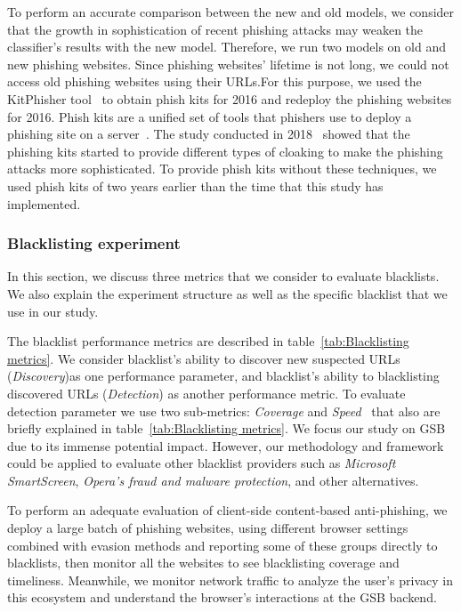 To perform an accurate comparison between the new and old models, we consider that the growth in sophistication of recent phishing attacks may weaken the classifier's results with the new model. Therefore, we run two models on old and new phishing websites.
Since phishing websites' lifetime is not long, we could not access old phishing websites using their URLs.For this purpose, we used the KitPhisher tool~\cite{cybercdh} to obtain phish kits for 2016 and redeploy the phishing websites for 2016.
Phish kits are a unified set of tools that phishers use to deploy a phishing site on a server~\cite{mccalley2011analysis}. The study conducted in 2018~\cite{oest2018inside} showed that the phishing kits started to provide different types of cloaking to make the phishing attacks more sophisticated. To provide phish kits without these techniques, we used phish kits of two years earlier than the time that this study has implemented.

\subsubsection{Blacklisting experiment}
In this section, we discuss three metrics that we consider to evaluate blacklists. We also explain the experiment structure as well as the specific blacklist that we use in our study. 

The blacklist performance metrics are described in table~\ref{tab:Blacklisting metrics}. We consider blacklist's ability to discover new suspected URLs
(\textit{Discovery})as one performance parameter, and blacklist's ability to blacklisting discovered URLs (\textit{Detection})  as another performance metric. To evaluate detection parameter we use two sub-metrics: \textit{Coverage} and \textit{Speed}~\cite{oest2020phishtime} that also are briefly explained in table~\ref{tab:Blacklisting metrics}. 
We focus our study on GSB due to its immense potential impact. However, our methodology and framework could be applied to evaluate other blacklist providers such as \textit{Microsoft SmartScreen}, \textit{Opera's fraud and malware protection}, and other alternatives.

To perform an adequate evaluation of client-side content-based anti-phishing, we deploy a large batch of phishing websites, using different browser settings combined with evasion methods and reporting some of these groups directly to blacklists, then monitor all the websites to see blacklisting coverage and timeliness. Meanwhile, we monitor network traffic to analyze the user's privacy in this ecosystem and understand the browser's interactions at the GSB backend.


